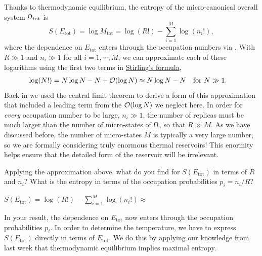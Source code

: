 Thanks to thermodynamic equilibrium, the entropy of the micro-canonical overall system $\Omega_{\text{tot}}$ is
\begin{equation*}
  S(E_{\text{tot}}) = \log M_{\text{tot}} = \log(R!) - \sum_{i = 1}^M \log(n_i!),
\end{equation*}
where the dependence on $E_{\text{tot}}$ enters through the occupation numbers via .
With $R \gg 1$ and $n_i \gg 1$ for all $i = 1, \cdots, M$, we can approximate each of these logarithms using the first two terms in \href{https://en.wikipedia.org/wiki/Stirling's_approximation}{Stirling's formula},
\begin{align*}
  \log(N!) & = N \log N - N + \mathcal O(\log N) \approx N \log N - N &
  \mbox{for } N & \gg 1.
\end{align*}
Back in  we used the central limit theorem to derive a form of this approximation that included a leading term from the $\mathcal O(\log N)$ we neglect here.
In order for \textit{every} occupation number to be large, $n_i \gg 1$, the number of replicas must be much larger than the number of micro-states of $\Omega$, so that $R \gg M$.
As we have discussed before, the number of micro-states $M$ is typically a very large number, so we are formally considering truly enormous thermal reservoirs!
This enormity helps ensure that the detailed form of the reservoir will be irrelevant.

Applying the approximation above, what do you find for $S(E_{\text{tot}})$ in terms of $R$ and $n_i$?
What is the entropy in terms of the occupation probabilities $p_i = n_i / R$?
\begin{mdframed}
  $\displaystyle S(E_{\text{tot}}) = \log(R!) - \sum_{i = 1}^M \log(n_i!) \approx $ \\[100 pt]
\end{mdframed}

In your result, the dependence on $E_{\text{tot}}$ now enters through the occupation probabilities $p_i$.
In order to determine the temperature, we have to express $S(E_{\text{tot}})$ directly in terms of $E_{\text{tot}}$.
We do this by applying our knowledge from last week that thermodynamic equilibrium implies maximal entropy.

